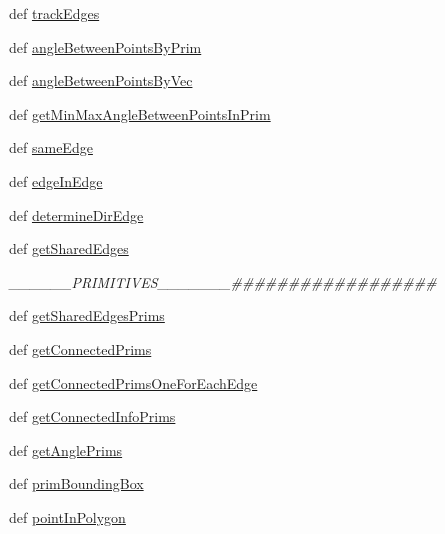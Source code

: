 \begin{DoxyCompactItemize}
\item 
def \hyperlink{namespacelib_1_1_geo_math_a57d792456bf48c552199d91cd8809901}{track\-Edges}
\item 
def \hyperlink{namespacelib_1_1_geo_math_a25463021d6f242d45e3fa8851aa0a9e3}{angle\-Between\-Points\-By\-Prim}
\item 
def \hyperlink{namespacelib_1_1_geo_math_ae7aa871e06ac4d8f8fdb10e41700a597}{angle\-Between\-Points\-By\-Vec}
\item 
def \hyperlink{namespacelib_1_1_geo_math_a88d29e0eb1bbb72408fad76261f66116}{get\-Min\-Max\-Angle\-Between\-Points\-In\-Prim}
\item 
def \hyperlink{namespacelib_1_1_geo_math_a593c12111b8ed698b2ae8ebb928051ae}{same\-Edge}
\item 
def \hyperlink{namespacelib_1_1_geo_math_a9727ad188ab7518fcce8d012622919a2}{edge\-In\-Edge}
\item 
def \hyperlink{namespacelib_1_1_geo_math_a062fed971459761f2ce8342ab4661a9e}{determine\-Dir\-Edge}
\item 
def \hyperlink{namespacelib_1_1_geo_math_a0b16c5fdc7ee1ab936b9860ed41cdf4b}{get\-Shared\-Edges}
\begin{DoxyCompactList}\small\item\em \-\_\-\-\_\-\-\_\-\-\_\-\-\_\-\-\_\-\-P\-R\-I\-M\-I\-T\-I\-V\-E\-S\-\_\-\-\_\-\-\_\-\-\_\-\-\_\-\-\_\-\-\_\-\#\#\#\#\#\#\#\#\#\#\#\#\#\#\#\#\#\# \end{DoxyCompactList}\item 
def \hyperlink{namespacelib_1_1_geo_math_a914d76847a5006484e3f93cf3948b80d}{get\-Shared\-Edges\-Prims}
\item 
def \hyperlink{namespacelib_1_1_geo_math_ab9c297afbe6c1ed0e703daf5295e334f}{get\-Connected\-Prims}
\item 
def \hyperlink{namespacelib_1_1_geo_math_acacaf7c53bb217b3c32e6b477f5168c4}{get\-Connected\-Prims\-One\-For\-Each\-Edge}
\item 
def \hyperlink{namespacelib_1_1_geo_math_aaf995f8112d80cb92aaa02df7b0f8457}{get\-Connected\-Info\-Prims}
\item 
def \hyperlink{namespacelib_1_1_geo_math_a31ce5801574f78c504a9e6369fc6c2e3}{get\-Angle\-Prims}
\item 
def \hyperlink{namespacelib_1_1_geo_math_a0b6c89546138470cad219a8cbdf84bff}{prim\-Bounding\-Box}
\item 
def \hyperlink{namespacelib_1_1_geo_math_ad6e13525aa4d639ef6860c8862fe88a7}{point\-In\-Polygon}
\item 

\end{DoxyCompactItemize}
